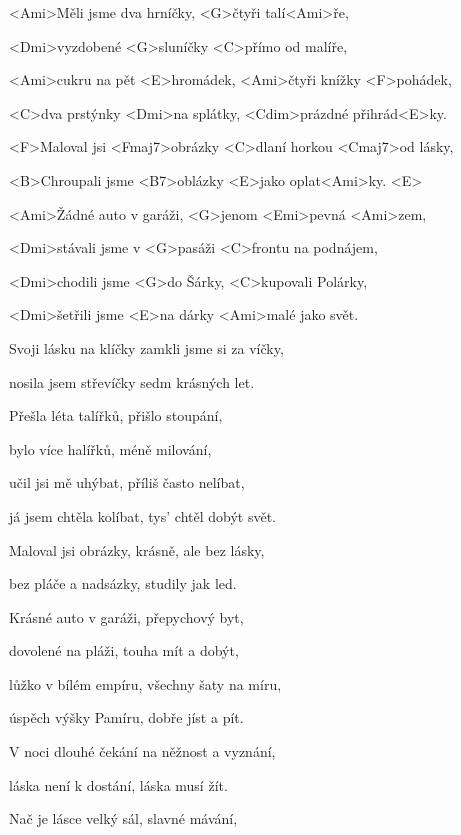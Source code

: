 

\zs
<Ami>Měli jsme dva hrníčky, <G>čtyři talí<Ami>ře,

<Dmi>vyzdobené <G>sluníčky <C>přímo od malíře,

<Ami>cukru na pět <E>hromádek, <Ami>čtyři {knížky} <F>pohádek,

<C>dva prstýnky <Dmi>na splátky, <Cdim>prázdné přihrád<E>ky.

\bigskip

<F>Maloval jsi <Fmaj7>obrázky <C>dlaní horkou <Cmaj7>od lásky,

<B>Chroupali jsme <B7>oblázky <E>jako oplat<Ami>ky. <E> 
\ks


\zr
<Ami>Žádné auto v garáži, <G>jenom <Emi>pevná <Ami>zem,

<Dmi>stávali jsme v <G>pasáži <C>frontu na podnájem,

<Dmi>chodili jsme <G>do Šárky, <C>kupovali Polárky,

<Dmi>šetřili jsme <E>na dárky <Ami>malé jako svět.

\bigskip

Svoji lásku na klíčky zamkli jsme si za víčky,

nosila jsem střevíčky sedm krásných let.
\kr


\zs
Přešla léta talířků, přišlo stoupání,

bylo více halířků, méně milování,

učil jsi mě uhýbat, příliš často nelíbat,

já jsem chtěla kolíbat, tys' chtěl dobýt svět.

\bigskip

Maloval jsi obrázky, krásně, ale bez lásky,

bez pláče a nadsázky, studily jak led.
\ks

\zr
Krásné auto v garáži, přepychový byt,

dovolené na pláži, touha mít a dobýt,

lůžko v bílém empíru, všechny šaty na míru,

úspěch výšky Pamíru, dobře jíst a pít.

\bigskip

V noci dlouhé čekání na něžnost a vyznání,

láska není k dostání, láska musí žít.
\kr

\zs

Nač je lásce velký sál, slavné mávání,

